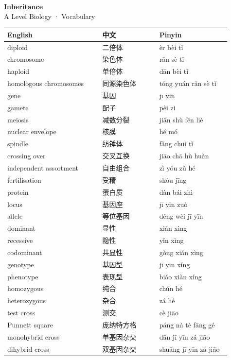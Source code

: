 \documentclass[11pt]{article}
\begin{document}
\begin{center}
  {\LARGE\bfseries Inheritance}\\[0.35em]
  {\large A Level Biology · Vocabulary}
\end{center}
\vspace{0.6em}

\begin{longtable}{@{}p{0.40\linewidth}p{0.24\linewidth}p{0.30\linewidth}@{}}
\toprule
\textbf{English} & \textbf{中文} & \textbf{Pinyin} \\
\midrule
\endhead
\bottomrule
\endlastfoot
diploid & 二倍体 & èr bèi tǐ \\
chromosome & 染色体 & rǎn sè tǐ \\
haploid & 单倍体 & dān bèi tǐ \\
homologous chromosomes & 同源染色体 & tóng yuán rǎn sè tǐ \\
gene & 基因 & jī yīn \\
gamete & 配子 & pèi zi \\
meiosis & 减数分裂 & jiǎn shù fēn liè \\
nuclear envelope & 核膜 & hé mó \\
spindle & 纺锤体 & fǎng chuí tǐ \\
crossing over & 交叉互换 & jiāo chā hù huàn \\
independent assortment & 自由组合 & zì yóu zǔ hé \\
fertilisation & 受精 & shòu jīng \\
protein & 蛋白质 & dàn bái zhì \\
locus & 基因座 & jī yīn zuò \\
allele & 等位基因 & děng wèi jī yīn \\
dominant & 显性 & xiǎn xìng \\
recessive & 隐性 & yǐn xìng \\
codominant & 共显性 & gòng xiǎn xìng \\
genotype & 基因型 & jī yīn xíng \\
phenotype & 表现型 & biǎo xiàn xíng \\
homozygous & 纯合 & chún hé \\
heterozygous & 杂合 & zá hé \\
test cross & 测交 & cè jiāo \\
Punnett square & 庞纳特方格 & páng nà tè fāng gé \\
monohybrid cross & 单基因杂交 & dān jī yīn zá jiāo \\
dihybrid cross & 双基因杂交 & shuāng jī yīn zá jiāo \\

\end{longtable}
\end{document}
